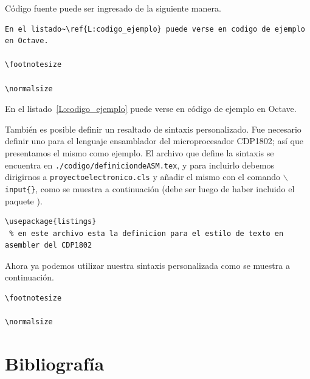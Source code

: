 Código fuente puede ser ingresado de la siguiente manera.

\footnotesize
\begin{lstlisting}
En el listado~\ref{L:codigo_ejemplo} puede verse en codigo de ejemplo en Octave.

\footnotesize

\normalsize
\end{lstlisting}
\normalsize

En el listado~\ref{L:codigo_ejemplo} puede verse en código de ejemplo en Octave.

\footnotesize

\normalsize

También es posible definir un resaltado de sintaxis personalizado. Fue necesario definir uno para el lenguaje ensamblador del microprocesador CDP1802; así que presentamos el mismo como ejemplo. El archivo que define la sintaxis se encuentra en \texttt{./codigo/definiciondeASM.tex}, y para incluirlo debemos dirigirnos a \texttt{proyectoelectronico.cls} y añadir el mismo con el comando \texttt{$ \backslash$input\{\}}, como se muestra a continuación (debe ser luego de haber incluido el paquete ).

\footnotesize
\begin{lstlisting}
\usepackage{listings}
 % en este archivo esta la definicion para el estilo de texto en asembler del CDP1802
\end{lstlisting}
\normalsize

Ahora ya podemos utilizar nuestra sintaxis personalizada como se muestra a continuación.

\clearpage

\footnotesize
\begin{lstlisting}
\footnotesize

\normalsize
\end{lstlisting}
\normalsize

\footnotesize

\normalsize

\clearpage
\section{Bibliografía}

